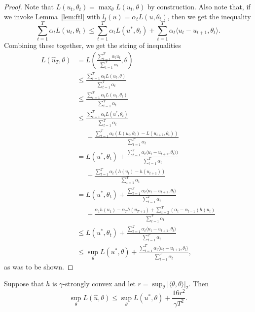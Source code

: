 \documentclass{article}
\begin{document}
\begin{proof}
Note that $L(u_t, \theta_t) = \max_{\theta} L(u_t, \theta)$ by construction. Also note that, if we invoke 
Lemma~\ref{lem:ftl} with $l_t(u) = \alpha_t L(u, \theta_t)$, then we get the inequality
\[ \sum_{t=1}^T \alpha_t L(u_t, \theta_t) \leq \sum_{t=1}^T \alpha_t L(u^*, \theta_t) + \sum_{t=1}^T \alpha_t \langle u_t - u_{t+1}, \theta_t \rangle. \]
Combining these together, we get the string of inequalities
\begin{align*}
L(\hat{u}_T, \theta) &= L\left(\frac{\sum_{t=1}^T \alpha_tu_t}{\sum_{t=1}^T \alpha_t}, \theta\right) \\
 &\leq \frac{\sum_{t=1}^T \alpha_t L(u_t, \theta)}{\sum_{t=1}^T \alpha_t} \\
 &\leq \frac{\sum_{t=1}^T \alpha_t L(u_t, \theta_t)}{\sum_{t=1}^T \alpha_t} \\
 &\leq \frac{\sum_{t=1}^T \alpha_tL(u^*, \theta_t)}{\sum_{t=1}^T \alpha_t} \\ &\phantom{=} + \frac{\sum_{t=1}^T \alpha_t (L(u_t,\theta_t)-L(u_{t+1},\theta_t))}{\sum_{t=1}^T \alpha_t} \\
 &= L(u^*, \theta_t) + \frac{\sum_{t=1}^T \alpha_t \langle u_t - u_{t+1}, \theta_t \rangle)}{\sum_{t=1}^T \alpha_t} \\ &\phantom{=} + \frac{\sum_{t=1}^{T} \alpha_t(h(u_t)-h(u_{t+1}))}{\sum_{t=1}^T \alpha_t} \\
 &= L(u^*, \theta_t) + \frac{\sum_{t=1}^T \alpha_t \langle u_t - u_{t+1}, \theta_t \rangle}{\sum_{t=1}^T \alpha_t} \\ &\phantom{=} + \frac{\alpha_1 h(u_1) - \alpha_T h(u_{T+1}) + \sum_{t=2}^{T} (\alpha_t-\alpha_{t-1}) h(u_t)}{\sum_{t=1}^T \alpha_t} \\
 &\leq L(u^*, \theta_t) + \frac{\sum_{t=1}^T \alpha_t \langle u_t - u_{t+1}, \theta_t \rangle}{\sum_{t=1}^T \alpha_t} \\
 &\leq \sup_{\theta} L(u^*, \theta) + \frac{\sum_{t=1}^T \alpha_t \langle u_t - u_{t+1}, \theta_t \rangle}{\sum_{t=1}^T \alpha_t},
\end{align*}
as was to be shown.
\end{proof}
\begin{corollary}
\label{cor:method-1}
Suppose that $h$ is $\gamma$-strongly convex and let $r = \sup_{\theta} |\langle \theta, \theta \rangle|_2$. Then 
\[ \sup_{\theta} L(\hat{u}, \theta) \leq \sup_{\theta} L(u^*, \theta) + \frac{16r^2}{\gamma T^2}. \]
\end{corollary}
\end{document}
